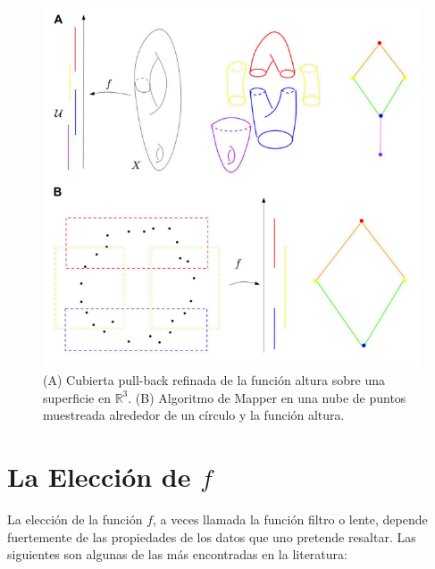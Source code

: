 \newpage

\begin{figure}[ht]
    \centering
    \includegraphics[width=0.85\linewidth]{./figures/Figura4.png}
    \caption{
        (A) Cubierta pull-back refinada de la funci\'on altura sobre una superficie en $\mathbb{R}^{3}$.
        (B) Algoritmo de Mapper en una nube de puntos muestreada alrededor de un c\'irculo y la
        funci\'on altura.
    }
    \label{fig:Figura 4}
    \vspace{15pt}
\end{figure}

\section*{La Elecci\'on de $f$}

La elecci\'on de la funci\'on $f$, a veces llamada la funci\'on filtro o lente, depende fuertemente de las
propiedades de los datos que uno pretende resaltar. Las siguientes son algunas de las m\'as encontradas en
la literatura:

